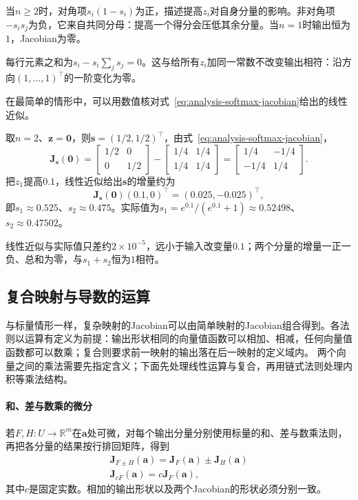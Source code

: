 当$n\geq2$时，对角项$s_i(1-s_i)$为正，描述提高$z_i$对自身分量的影响。非对角项$-s_is_j$为负，它来自共同分母：提高一个得分会压低其余分量。当$n=1$时输出恒为$1$，Jacobian为零。

每行元素之和为$s_i-s_i\sum_js_j=0$。这与给所有$z_i$加同一常数不改变输出相符：沿方向$(1,\ldots,1)^\top$的一阶变化为零。

在最简单的情形中，可以用数值核对式~\eqref{eq:analysis-softmax-jacobian}给出的线性近似。
\begin{example}[二维softmax的Jacobian矩阵]
\label{ex:multivariable-softmax-jacobian-check}
取$n=2$、$\bm z=\bm 0$，则$\bm s=(1/2,1/2)^\top$，由式~\eqref{eq:analysis-softmax-jacobian}，
\[
 \bm J_{\bm s}(\bm 0)
 =\begin{bmatrix}1/2&0\\0&1/2\end{bmatrix}-\begin{bmatrix}1/4&1/4\\1/4&1/4\end{bmatrix}
 =\begin{bmatrix}1/4&-1/4\\-1/4&1/4\end{bmatrix}.
\]
把$z_1$提高$0.1$，线性近似给出$\bm s$的增量约为
\[
 \bm J_{\bm s}(\bm 0)(0.1,0)^\top=(0.025,-0.025)^\top,
\]
即$s_1\approx0.525$、$s_2\approx0.475$。实际值为$s_1=e^{0.1}/(e^{0.1}+1)\approx0.52498$、$s_2\approx0.47502$。
\end{example}

线性近似与实际值只差约$2\times10^{-5}$，远小于输入改变量$0.1$；两个分量的增量一正一负、总和为零，与$s_1+s_2$恒为$1$相符。

\subsection{复合映射与导数的运算}
\label{sec:analysis-vector-chain-matrix-calculus}

与标量情形一样，复杂映射的Jacobian可以由简单映射的Jacobian组合得到。各法则以运算有定义为前提：输出形状相同的向量值函数可以相加、相减，任何向量值函数都可以数乘；复合则要求前一映射的输出落在后一映射的定义域内。
两个向量之间的乘法需要先指定含义；下面先处理线性运算与复合，再用链式法则处理内积等乘法结构。

\paragraph{和、差与数乘的微分}
若$F,H:U\to\mathbb R^m$在$\bm a$处可微，对每个输出分量分别使用标量的和、差与数乘法则，再把各分量的结果按行排回矩阵，得到
\[
 \begin{gathered}
 \bm J_{F\pm H}(\bm a)=\bm J_F(\bm a)\pm\bm J_H(\bm a)\\
 \bm J_{cF}(\bm a)=c\bm J_F(\bm a),
 \end{gathered}
\]
其中$c$是固定实数。相加的输出形状以及两个Jacobian的形状必须分别一致。


